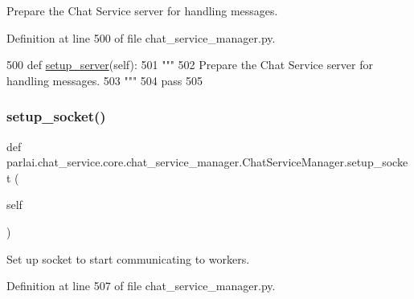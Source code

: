 \begin{DoxyVerb}Prepare the Chat Service server for handling messages.
\end{DoxyVerb}
 

Definition at line 500 of file chat\+\_\+service\+\_\+manager.\+py.


\begin{DoxyCode}
500     \textcolor{keyword}{def }\hyperlink{namespaceparlai_1_1chat__service_1_1services_1_1messenger_1_1server__utils_afb56b04206cd0f42384438f1ac6d9cda}{setup\_server}(self):
501         \textcolor{stringliteral}{"""}
502 \textcolor{stringliteral}{        Prepare the Chat Service server for handling messages.}
503 \textcolor{stringliteral}{        """}
504         \textcolor{keywordflow}{pass}
505 
\end{DoxyCode}
\mbox{\label{classparlai_1_1chat__service_1_1core_1_1chat__service__manager_1_1ChatServiceManager_a167613812d6f3eaaa0fb1b36bf98be09}} 
\subsubsection{\texorpdfstring{setup\+\_\+socket()}{setup\_socket()}}
{\footnotesize\ttfamily def parlai.\+chat\+\_\+service.\+core.\+chat\+\_\+service\+\_\+manager.\+Chat\+Service\+Manager.\+setup\+\_\+socket (\begin{DoxyParamCaption}\item[{}]{self }\end{DoxyParamCaption})}

\begin{DoxyVerb}Set up socket to start communicating to workers.
\end{DoxyVerb}
 

Definition at line 507 of file chat\+\_\+service\+\_\+manager.\+py.


